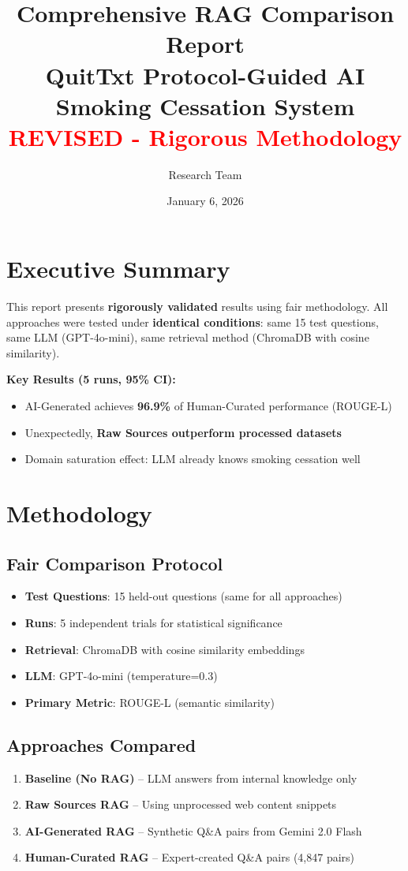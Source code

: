 \documentclass[11pt]{article}
\title{\textbf{Comprehensive RAG Comparison Report}\\
\large QuitTxt Protocol-Guided AI Smoking Cessation System\\
\normalsize \textcolor{red}{REVISED - Rigorous Methodology}}
\author{Research Team}
\date{January 6, 2026}
\begin{document}
\maketitle

\section{Executive Summary}

This report presents \textbf{rigorously validated} results using fair methodology. All approaches were tested under \textbf{identical conditions}: same 15 test questions, same LLM (GPT-4o-mini), same retrieval method (ChromaDB with cosine similarity).

\noindent\textbf{Key Results (5 runs, 95\% CI):}
\begin{itemize}
    \item AI-Generated achieves \textbf{96.9\%} of Human-Curated performance (ROUGE-L)
    \item Unexpectedly, \textbf{Raw Sources outperform processed datasets}
    \item Domain saturation effect: LLM already knows smoking cessation well
\end{itemize}

\section{Methodology}

\subsection{Fair Comparison Protocol}
\begin{itemize}
    \item \textbf{Test Questions}: 15 held-out questions (same for all approaches)
    \item \textbf{Runs}: 5 independent trials for statistical significance
    \item \textbf{Retrieval}: ChromaDB with cosine similarity embeddings
    \item \textbf{LLM}: GPT-4o-mini (temperature=0.3)
    \item \textbf{Primary Metric}: ROUGE-L (semantic similarity)
\end{itemize}

\subsection{Approaches Compared}
\begin{enumerate}
    \item \textbf{Baseline (No RAG)} -- LLM answers from internal knowledge only
    \item \textbf{Raw Sources RAG} -- Using unprocessed web content snippets
    \item \textbf{AI-Generated RAG} -- Synthetic Q\&A pairs from Gemini 2.0 Flash
    \item \textbf{Human-Curated RAG} -- Expert-created Q\&A pairs (4,847 pairs)
\end{enumerate}
\end{document}
